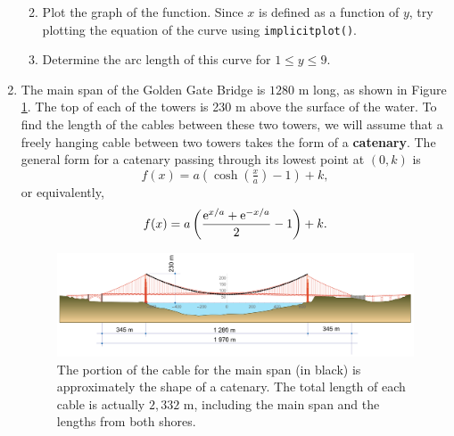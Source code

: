 \begin{enumerate}
    \begin{enumerate} 
        \item Plot the graph of the function. Since $x$ is defined as a function of $y$, try plotting the equation of the curve using \texttt{implicitplot()}.
        \item Determine the arc length of this curve for $1 \leq y \leq 9$.
    \end{enumerate}
    \item The main span of the Golden Gate Bridge is $1280$ m long, as shown in Figure \ref{fig:goldengate}. The top of each of the towers is 230 m above the surface of the water. To find the length of the cables between these two towers, we will assume that a freely hanging cable between two towers takes the form of a \textbf{catenary}. 
    \clearpage
    The general form for a catenary passing through its lowest point at $(0,k)$ is 
    \begin{equation}
        \label{eq:catenary}
        f(x) = a\left(\cosh\left(\tfrac{x}{a}\right)-1\right)+k,
    \end{equation}
    or equivalently,
    \[f(x) = a\left(\frac{{\rm e}^{x/a} + {\rm e}^{-x/a}}{2}-1\right)+k.\]
	
	\begin{figure}[h]
        \label{fig:goldengate}
        \centering
    	\includegraphics[width=1\linewidth]{activities/math122/figures/goldengate.png}
    	\caption{The portion of the cable for the main span (in black) is approximately the shape of a catenary. The total length of each cable is actually $2{,}332$ m, including the main span and the lengths from both shores.}
    \end{figure}
    

\end{enumerate}
